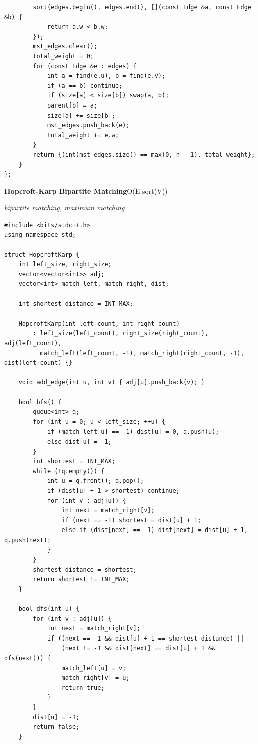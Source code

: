 \documentclass[8pt,a4paper,landscape]{article}
\begin{document}
\begin{multicols}{3}
\begin{lstlisting}
        sort(edges.begin(), edges.end(), [](const Edge &a, const Edge &b) {
            return a.w < b.w;
        });
        mst_edges.clear();
        total_weight = 0;
        for (const Edge &e : edges) {
            int a = find(e.u), b = find(e.v);
            if (a == b) continue;
            if (size[a] < size[b]) swap(a, b);
            parent[b] = a;
            size[a] += size[b];
            mst_edges.push_back(e);
            total_weight += e.w;
        }
        return {(int)mst_edges.size() == max(0, n - 1), total_weight};
    }
};
\end{lstlisting}
\vspace{1pt}
\textbf{Hopcroft-Karp Bipartite Matching}\hfill{\scriptsize O(E sqrt(V))}\par
{\scriptsize\itshape bipartite matching, maximum matching}\par
\begin{lstlisting}
#include <bits/stdc++.h>
using namespace std;

struct HopcroftKarp {
    int left_size, right_size;
    vector<vector<int>> adj;
    vector<int> match_left, match_right, dist;

    int shortest_distance = INT_MAX;

    HopcroftKarp(int left_count, int right_count)
        : left_size(left_count), right_size(right_count), adj(left_count),
          match_left(left_count, -1), match_right(right_count, -1), dist(left_count) {}

    void add_edge(int u, int v) { adj[u].push_back(v); }

    bool bfs() {
        queue<int> q;
        for (int u = 0; u < left_size; ++u) {
            if (match_left[u] == -1) dist[u] = 0, q.push(u);
            else dist[u] = -1;
        }
        int shortest = INT_MAX;
        while (!q.empty()) {
            int u = q.front(); q.pop();
            if (dist[u] + 1 > shortest) continue;
            for (int v : adj[u]) {
                int next = match_right[v];
                if (next == -1) shortest = dist[u] + 1;
                else if (dist[next] == -1) dist[next] = dist[u] + 1, q.push(next);
            }
        }
        shortest_distance = shortest;
        return shortest != INT_MAX;
    }

    bool dfs(int u) {
        for (int v : adj[u]) {
            int next = match_right[v];
            if ((next == -1 && dist[u] + 1 == shortest_distance) ||
                (next != -1 && dist[next] == dist[u] + 1 && dfs(next))) {
                match_left[u] = v;
                match_right[v] = u;
                return true;
            }
        }
        dist[u] = -1;
        return false;
    }


\end{lstlisting}
\end{multicols}
\end{document}
